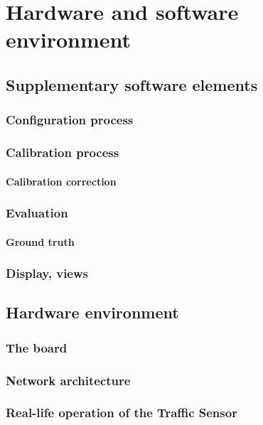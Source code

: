 \chapter{Hardware and software environment}\label{chap:Environment}
\section{Supplementary software elements}\label{sec:SupplementarySoftware}

\subsection{Configuration process}\label{subs:ProjectConfigurator}

\subsection{Calibration process}
\subsubsection{Calibration correction}

\subsection{Evaluation}
\subsubsection{Ground truth}

\subsection{Display, views}
\section{Hardware environment}

\subsection{The board}
\subsection{Network architecture}
\subsection{Real-life operation of the Traffic Sensor}


